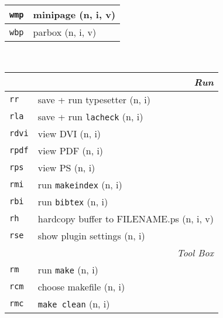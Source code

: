 \documentclass[oneside,10pt,landscape,DIV17]{scrartcl}
\newcommand{\Map}[1] {\textbf{\textasciiacute}\texttt{#1}}
\begin{document}
\begin{multicols}{3}
\begin{center}
\begin{tabular}[]{|p{11mm}|p{62mm}|}
\hline  \Map{wmp}  & minipage                 \hfill (n, i, v)\\
\hline  \Map{wbp}  & parbox                   \hfill (n, i, v)\\
\hline
%
\end{tabular}\\
%
\newpage
%
\begin{tabular}[]{|p{11mm}|p{63mm}|}
\hline
\multicolumn{2}{|r|}{\textsl{\textbf{R}un}} \\[1.0ex]
\hline \Map{rr}   & save + run typesetter                    \hfill (n, i)\\
\hline \Map{rla}  & save + run \texttt{lacheck}              \hfill (n, i)\\
\hline \Map{rdvi} & view DVI                                 \hfill (n, i)\\
\hline \Map{rpdf} & view PDF                                 \hfill (n, i)\\
\hline \Map{rps}  & view PS                                  \hfill (n, i)\\
\hline
\hline \Map{rmi}  & run \texttt{makeindex}                   \hfill (n, i)\\
\hline \Map{rbi}  & run \texttt{bibtex}                      \hfill (n, i)\\
\hline \Map{rh}   & hardcopy buffer to \small{FILENAME}.ps   \hfill (n, i, v)\\
\hline \Map{rse}  & show plugin settings                     \hfill (n, i)\\
\hline
\hline
\multicolumn{2}{|r|}{\textsl{Tool Box}} \\[1.0ex]
\hline \Map{rm}  & run \texttt{make}                        \hfill (n, i)   \\
\hline \Map{rcm} & choose makefile                          \hfill (n, i)   \\
\hline \Map{rmc} & \texttt{make clean}                      \hfill (n, i)   \\

\end{tabular}
\end{center}
\end{multicols}
\end{document}
